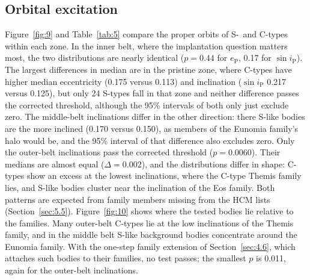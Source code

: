 \documentclass[twocolumn]{aastex701}
\begin{document}
\subsection{Orbital excitation}\label{sec:4.5}
Figure~\ref{fig:9} and Table~\ref{tab:5} compare the proper orbits of \mbox{S-}~and C-types within each zone. In the inner belt, where the implantation question matters most, the two distributions are nearly identical ($p = 0.44$ for $e_{\mathrm{P}}$, 0.17 for $\sin i_{\mathrm{P}}$). The largest differences in median are in the pristine zone, where C-types have higher median eccentricity (0.175 versus 0.113) and inclination ($\sin i_{\mathrm{P}}$ 0.217 versus 0.125), but only 24 S-types fall in that zone and neither difference passes the corrected threshold, although the 95\% intervals of both only just exclude zero. The middle-belt inclinations differ in the other direction: there S-like bodies are the more inclined (0.170 versus 0.150), as members of the Eunomia family’s halo would be, and the 95\% interval of that difference also excludes zero. Only the outer-belt inclinations pass the corrected threshold ($p = 0.0060$). Their medians are almost equal ($\Delta = 0.002$), and the distributions differ in shape: \mbox{C-types} show an excess at the lowest inclinations, where the C-type Themis family lies, and S-like bodies cluster near the inclination of the Eos family. Both patterns are expected from family members missing from the HCM lists (Section~\ref{sec:5.5}). Figure~\ref{fig:10} shows where the tested bodies lie relative to the families. Many outer-belt \mbox{C-types} lie at the low inclinations of the Themis family, and in the middle belt S-like background bodies concentrate around the Eunomia family. With the one-step family extension of Section~\ref{sec:4.6}, which attaches such bodies to their families, no test passes; the smallest $p$ is 0.011, again for the outer-belt inclinations.
\end{document}
